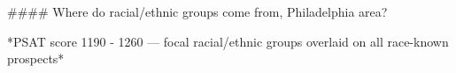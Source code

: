 #### Where do racial/ethnic groups come from, Philadelphia area?

*PSAT score 1190 - 1260 — focal racial/ethnic groups overlaid on all race-known prospects*
